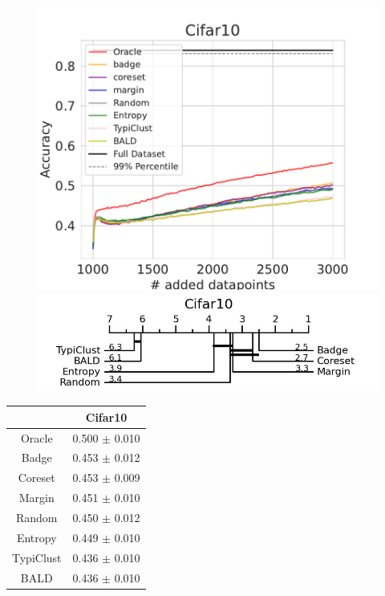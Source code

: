 \documentclass[]{article}
\begin{document}
\begin{minipage}{0.65\linewidth}
\begin{figure}[H]
    \centering
    \includegraphics[width=\linewidth]{img/eval_cifar10}\\ [2mm]
    \includegraphics[width=\linewidth]{img/micro_cifar10.jpg}
\end{figure}
\end{minipage}
\begin{minipage}{0.29\linewidth}
\begin{tabular}{c|c}
&Cifar10\\
\hline
Oracle&0.500 $\pm$ 0.010\\
Badge&0.453 $\pm$ 0.012\\
Coreset&0.453 $\pm$ 0.009\\
Margin&0.451 $\pm$ 0.010\\
Random&0.450 $\pm$ 0.012\\
Entropy&0.449 $\pm$ 0.010\\
TypiClust&0.436 $\pm$ 0.010\\
BALD&0.436 $\pm$ 0.010\\
\end{tabular}
\end{minipage}
\end{document}
